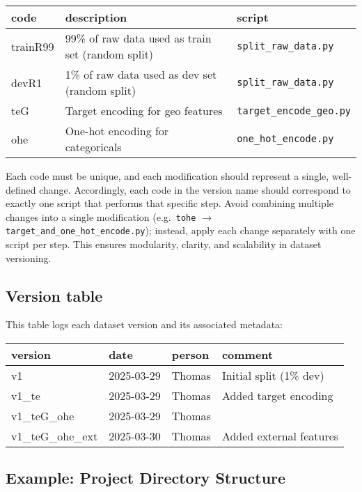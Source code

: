 \documentclass[12pt,openany]{book}
\begin{document}
\renewcommand{\arraystretch}{1.3}
\begin{tabular}{|l|p{9.5cm}|p{4.2cm}|}
\hline
\textbf{code} & \textbf{description} & \textbf{script} \\
\hline
trainR99 & 99\% of raw data used as train set (random split) & \texttt{split\_raw\_data.py} \\
devR1    & 1\% of raw data used as dev set (random split) & \texttt{split\_raw\_data.py} \\
teG       & Target encoding for geo features & \texttt{target\_encode\_geo.py} \\
ohe      & One-hot encoding for categoricals & \texttt{one\_hot\_encode.py} \\
\hline
\end{tabular}
\newline
\newline

Each code must be unique, and each modification should represent a single, well-defined change. Accordingly, each code in the version name should correspond to exactly one script that performs that specific step. Avoid combining multiple changes into a single modification (e.g.\ \texttt{tohe} \(\rightarrow\) \texttt{target\_and\_one\_hot\_encode.py}); instead, apply each change separately with one script per step. This ensures modularity, clarity, and scalability in dataset versioning.


\subsection{Version table}
This table logs each dataset version and its associated metadata:
\newline

\renewcommand{\arraystretch}{1.3}
\begin{tabular}{|l|p{2.5cm}|p{2.5cm}|p{5.5cm}|}
\hline
\textbf{version} & \textbf{date} & \textbf{person} & \textbf{comment} \\
\hline
v1 & 2025-03-29 & Thomas & Initial split (1\% dev) \\
v1\_te & 2025-03-29 & Thomas & Added target encoding \\
v1\_teG\_ohe & 2025-03-29 & Thomas &  \\
v1\_teG\_ohe\_ext & 2025-03-30 & Thomas & Added external features \\
\hline
\end{tabular}


\subsection{Example: Project Directory Structure}
\end{document}
